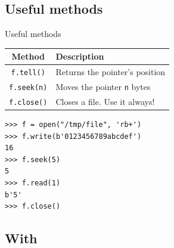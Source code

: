 \documentclass[10pt,compress]{beamer} %
\begin{document}
\subsection{Useful methods}
\begin{frame}[fragile]{Useful methods}

	\begin{tabular}{c|l}\hline
  	\sc Method & \sc Description  \\\hline
  	\texttt{f.tell()} & Returns the pointer's position \\
  	\texttt{f.seek(n)} & Moves the pointer \texttt{n} bytes \\
  	\texttt{f.close()} & Closes a file. Use it always! \\\hline
  	\end{tabular}

\begin{verbatim}
>>> f = open("/tmp/file", 'rb+')
>>> f.write(b'0123456789abcdef')
16
>>> f.seek(5)
5
>>> f.read(1)
b'5'
>>> f.close()
\end{verbatim}
\end{frame}

\subsection{With}
\end{document}
